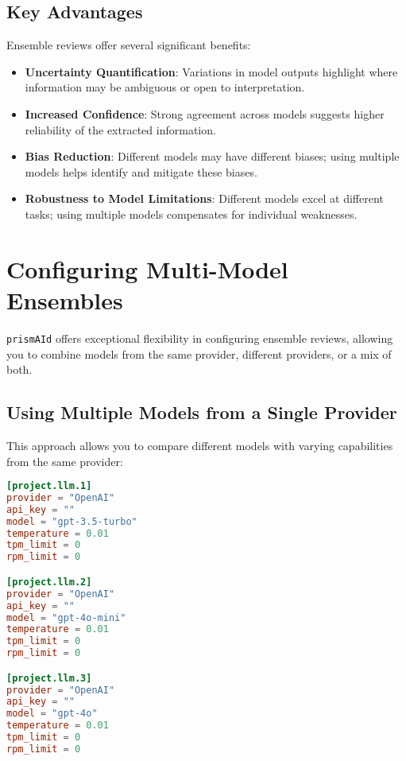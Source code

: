 \subsection{Key Advantages}

Ensemble reviews offer several significant benefits:

\begin{itemize}
    \item \textbf{Uncertainty Quantification}: Variations in model outputs highlight where information may be ambiguous or open to interpretation.
    \item \textbf{Increased Confidence}: Strong agreement across models suggests higher reliability of the extracted information.
    \item \textbf{Bias Reduction}: Different models may have different biases; using multiple models helps identify and mitigate these biases.
    \item \textbf{Robustness to Model Limitations}: Different models excel at different tasks; using multiple models compensates for individual weaknesses.
\end{itemize}


\section{Configuring Multi-Model Ensembles}

\texttt{prismAId} offers exceptional flexibility in configuring ensemble reviews, allowing you to combine models from the same provider, different providers, or a mix of both.

\subsection{Using Multiple Models from a Single Provider}

This approach allows you to compare different models with varying capabilities from the same provider:

\begin{configbox}
\begin{lstlisting}[language=TOML]
[project.llm.1]
provider = "OpenAI"
api_key = ""
model = "gpt-3.5-turbo"
temperature = 0.01
tpm_limit = 0
rpm_limit = 0

[project.llm.2]
provider = "OpenAI"
api_key = ""
model = "gpt-4o-mini"
temperature = 0.01
tpm_limit = 0
rpm_limit = 0

[project.llm.3]
provider = "OpenAI"
api_key = ""
model = "gpt-4o"
temperature = 0.01
tpm_limit = 0
rpm_limit = 0
\end{lstlisting}
\end{configbox}

